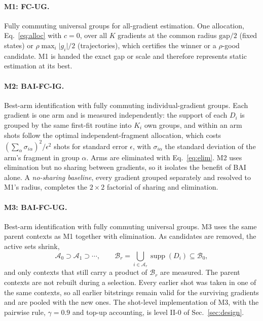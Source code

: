 \documentclass[aps,pra,reprint,superscriptaddress,nofootinbib]{revtex4-2}
\begin{document}
\paragraph{M1: FC-UG.} Fully commuting universal groups for all-gradient estimation. One allocation, Eq.~\eqref{eq:alloc} with $c=0$, over all $K$ gradients at the common radius $\mathrm{gap}/2$ (fixed states) or $\rho\max_i\lvert g_i\rvert/2$ (trajectories), which certifies the winner or a $\rho$-good candidate. M1 is handed the exact gap or scale and therefore represents static estimation at its best.

\paragraph{M2: BAI-FC-IG.} Best-arm identification with fully commuting individual-gradient groups. Each gradient is one arm and is measured independently: the support of each $D_i$ is grouped by the same first-fit routine into $K_i$ own groups, and within an arm shots follow the optimal independent-fragment allocation, which costs $(\sum_\alpha\sigma_{i\alpha})^2/\epsilon^2$ shots for standard error $\epsilon$, with $\sigma_{i\alpha}$ the standard deviation of the arm's fragment in group $\alpha$. Arms are eliminated with Eq.~\eqref{eq:elim}. M2 uses elimination but no sharing between gradients, so it isolates the benefit of BAI alone. A \emph{no-sharing baseline}, every gradient grouped separately and resolved to M1's radius, completes the $2\times2$ factorial of sharing and elimination.

\paragraph{M3: BAI-FC-UG.} Best-arm identification with fully commuting universal groups. M3 uses the same parent contexts as M1 together with elimination. As candidates are removed, the active sets shrink,
\begin{equation}
\mathcal A_0\supset\mathcal A_1\supset\cdots ,\qquad
\mathcal B_r=\bigcup_{i\in\mathcal A_r}\operatorname{supp}(D_i)\subseteq\mathcal B_0 ,
\end{equation}
and only contexts that still carry a product of $\mathcal B_r$ are measured. The parent contexts are not rebuilt during a selection. Every earlier shot was taken in one of the same contexts, so all earlier bitstrings remain valid for the surviving gradients and are pooled with the new ones. The shot-level implementation of M3, with the pairwise rule, $\gamma=0.9$ and top-up accounting, is level II-0 of Sec.~\ref{sec:design}.
\end{document}
